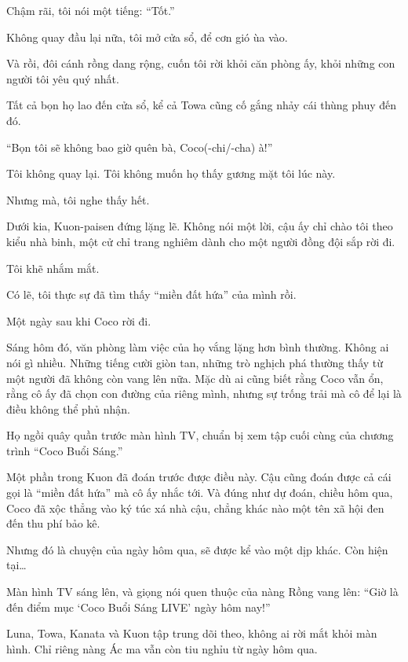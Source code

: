 \documentclass[../main.tex]{subfiles}
\begin{document}
Chậm rãi, tôi nói một tiếng: ``Tốt.''

Không quay đầu lại nữa, tôi mở cửa sổ, để cơn gió ùa vào.

Và rồi, đôi cánh rồng dang rộng, cuốn tôi rời khỏi căn phòng ấy, khỏi những con người tôi yêu quý nhất.

Tất cả bọn họ lao đến cửa sổ, kể cả Towa cũng cố gắng nhảy cái thùng phuy đến đó.

``Bọn tôi sẽ không bao giờ quên bà, Coco(-chi/-cha) à!''


Tôi không quay lại. Tôi không muốn họ thấy gương mặt tôi lúc này.

Nhưng mà, tôi nghe thấy hết.

Dưới kia, Kuon-paisen đứng lặng lẽ. Không nói một lời, cậu ấy chỉ chào tôi theo kiểu nhà binh, một cử chỉ trang nghiêm dành cho một người đồng đội sắp rời đi.

Tôi khẽ nhắm mắt.

Có lẽ, tôi thực sự đã tìm thấy ``miền đất hứa'' của mình rồi.

\omk

\pov{-}

Một ngày sau khi Coco rời đi.

Sáng hôm đó, văn phòng làm việc của họ vắng lặng hơn bình thường. Không ai nói gì nhiều. Những tiếng cười giòn tan, những trò nghịch phá thường thấy từ một người đã không còn vang lên nữa. Mặc dù ai cũng biết rằng Coco vẫn ổn, rằng cô ấy đã chọn con đường của riêng mình, nhưng sự trống trải mà cô để lại là điều không thể phủ nhận.

Họ ngồi quây quần trước màn hình TV, chuẩn bị xem tập cuối cùng của chương trình ``Coco Buổi Sáng.''

Một phần trong Kuon đã đoán trước được điều này. Cậu cũng đoán được cả cái gọi là ``miền đất hứa'' mà cô ấy nhắc tới. Và đúng như dự đoán, chiều hôm qua, Coco đã xộc thẳng vào ký túc xá nhà cậu, chẳng khác nào một tên xã hội đen đến thu phí bảo kê.

Nhưng đó là chuyện của ngày hôm qua, sẽ được kể vào một dịp khác. Còn hiện tại\dots

Màn hình TV sáng lên, và giọng nói quen thuộc của nàng Rồng vang lên: ``Giờ là đến điểm mục `Coco Buổi Sáng LIVE' ngày hôm nay!''

Luna, Towa, Kanata và Kuon tập trung dõi theo, không ai rời mắt khỏi màn hình. Chỉ riêng nàng Ác ma vẫn còn tiu nghỉu từ ngày hôm qua.
\end{document}
